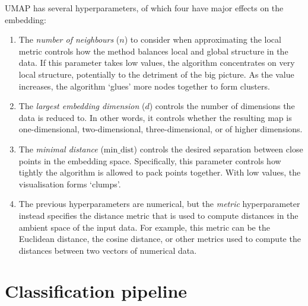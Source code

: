 UMAP has several hyperparameters, of which four have major effects on the embedding:
\begin{enumerate}
  \item The \emph{number of neighbours} ($n$) to consider when approximating the local metric controls how the method balances local and global structure in the data.
        If this parameter takes low values, the algorithm concentrates on very local structure, potentially to the detriment of the big picture.
        As the value increases, the algorithm `glues' more nodes together to form clusters.
  \item The \emph{largest embedding dimension} ($d$) controls the number of dimensions the data is reduced to.
        In other words, it controls whether the resulting map is one-dimensional, two-dimensional, three-dimensional, or of higher dimensions.
  \item The \emph{minimal distance} ($\mathrm{min\_dist}$) controls the desired separation between close points in the embedding space.
        Specifically, this parameter controls how tightly the algorithm is allowed to pack points together.
        With low values, the visualisation forms `clumps'.
  \item The previous hyperparameters are numerical, but the \emph{metric} hyperparameter instead specifies the distance metric that is used to compute distances in the ambient space of the input data.
        For example, this metric can be the Euclidean distance, the cosine distance, or other metrics used to compute the distances between two vectors of numerical data.
\end{enumerate}



\section{Classification pipeline}
\label{append:analysis-ml}

